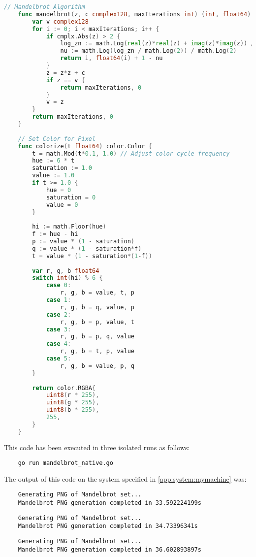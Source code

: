 \begin{lstlisting}[language=go, frame=tb, caption={Mandelbrot Set Calculation}]
    // Mandelbrot Algorithm
    func mandelbrot(z, c complex128, maxIterations int) (int, float64) {
        var v complex128
        for i := 0; i < maxIterations; i++ {
            if cmplx.Abs(z) > 2 {
                log_zn := math.Log(real(z)*real(z) + imag(z)*imag(z)) / 2
                nu := math.Log(log_zn / math.Log(2)) / math.Log(2)
                return i, float64(i) + 1 - nu
            }
            z = z*z + c
            if z == v {
                return maxIterations, 0
            }
            v = z
        }
        return maxIterations, 0
    }
    
    // Set Color for Pixel
    func colorize(t float64) color.Color {
        t = math.Mod(t*0.1, 1.0) // Adjust color cycle frequency
        hue := 6 * t
        saturation := 1.0
        value := 1.0
        if t >= 1.0 {
            hue = 0
            saturation = 0
            value = 0
        }
    
        hi := math.Floor(hue)
        f := hue - hi
        p := value * (1 - saturation)
        q := value * (1 - saturation*f)
        t = value * (1 - saturation*(1-f))
    
        var r, g, b float64
        switch int(hi) % 6 {
            case 0:
                r, g, b = value, t, p
            case 1:
                r, g, b = q, value, p
            case 2:
                r, g, b = p, value, t
            case 3:
                r, g, b = p, q, value
            case 4:
                r, g, b = t, p, value
            case 5:
                r, g, b = value, p, q
        }
    
        return color.RGBA{
            uint8(r * 255),
            uint8(g * 255),
            uint8(b * 255),
            255,
        }
    }    
\end{lstlisting}

This code has been executed in three isolated runs as follows:
\begin{lstlisting}
    go run mandelbrot_native.go
\end{lstlisting}

The output of this code on the system specified in \ref{app:system:mymachine} was:
\begin{lstlisting}
    Generating PNG of Mandelbrot set... 
    Mandelbrot PNG generation completed in 33.592224199s
\end{lstlisting}
\begin{lstlisting}
    Generating PNG of Mandelbrot set... 
    Mandelbrot PNG generation completed in 34.73396341s
\end{lstlisting}
\begin{lstlisting}
    Generating PNG of Mandelbrot set... 
    Mandelbrot PNG generation completed in 36.602893897s
\end{lstlisting}

